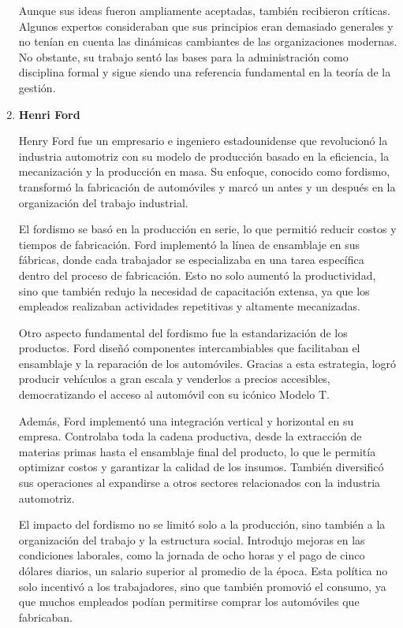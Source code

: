 \documentclass[a4paper,oneside,11pt]{article}
\begin{document}
\begin{enumerate}
        Aunque sus ideas fueron ampliamente aceptadas, también recibieron críticas. Algunos expertos consideraban que sus principios eran demasiado generales y no tenían en cuenta las dinámicas cambiantes de las organizaciones modernas. No obstante, su trabajo sentó las bases para la administración como disciplina formal y sigue siendo una referencia fundamental en la teoría de la gestión.

    \item \textbf{Henri Ford}

        Henry Ford fue un empresario e ingeniero estadounidense que revolucionó la industria automotriz con su modelo de producción basado en la eficiencia, la mecanización y la producción en masa. Su enfoque, conocido como fordismo, transformó la fabricación de automóviles y marcó un antes y un después en la organización del trabajo industrial.

        El fordismo se basó en la producción en serie, lo que permitió reducir costos y tiempos de fabricación. Ford implementó la línea de ensamblaje en sus fábricas, donde cada trabajador se especializaba en una tarea específica dentro del proceso de fabricación. Esto no solo aumentó la productividad, sino que también redujo la necesidad de capacitación extensa, ya que los empleados realizaban actividades repetitivas y altamente mecanizadas.
        
        Otro aspecto fundamental del fordismo fue la estandarización de los productos. Ford diseñó componentes intercambiables que facilitaban el ensamblaje y la reparación de los automóviles. Gracias a esta estrategia, logró producir vehículos a gran escala y venderlos a precios accesibles, democratizando el acceso al automóvil con su icónico Modelo T.
        
        Además, Ford implementó una integración vertical y horizontal en su empresa. Controlaba toda la cadena productiva, desde la extracción de materias primas hasta el ensamblaje final del producto, lo que le permitía optimizar costos y garantizar la calidad de los insumos. También diversificó sus operaciones al expandirse a otros sectores relacionados con la industria automotriz.
        
        El impacto del fordismo no se limitó solo a la producción, sino también a la organización del trabajo y la estructura social. Introdujo mejoras en las condiciones laborales, como la jornada de ocho horas y el pago de cinco dólares diarios, un salario superior al promedio de la época. Esta política no solo incentivó a los trabajadores, sino que también promovió el consumo, ya que muchos empleados podían permitirse comprar los automóviles que fabricaban.
        

\end{enumerate}
\end{document}
